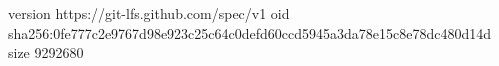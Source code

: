 version https://git-lfs.github.com/spec/v1
oid sha256:0fe777c2e9767d98e923c25c64c0defd60ccd5945a3da78e15c8e78dc480d14d
size 9292680
